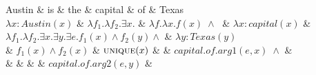 \documentclass{article}
\begin{document}
\thispagestyle{empty}
\begin{center}
 \begin{dependency}[theme = default]
   \begin{deptext}[column sep=0.5em]
   Austin \& is \& the \& capital \& of \& Texas \\
    \footnotesize $\lambda x : Austin(x)$ \& \footnotesize $\lambda f_1.
\lambda f_2. \exists x. $ \& \footnotesize $\lambda f.
\lambda x . f(x)\; \wedge\;$ \& \footnotesize $\lambda x : capital(x)$ \&
\footnotesize $\lambda f_1. \lambda f_2. \exists x . \exists y . \exists e .
f_1(x) \wedge f_2(y) \wedge$ \& \footnotesize $\lambda
y : Texas(y)$ \\ 
 \& \footnotesize $f_1(x) \wedge f_2(x)$ \& \footnotesize
$\mathrm{\textsc{unique}}(x)$ \& \& \footnotesize $capital.of.arg1(e, x)\;\wedge
$ \& \\
 \& \& \& \& \footnotesize $capital.of.arg2(e, y) $ \& \\
   \end{deptext}
   
   
\end{dependency}
\end{center}
\end{document}
